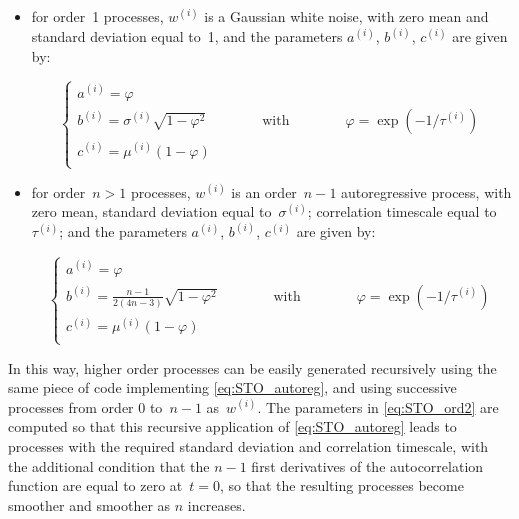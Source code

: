 \documentclass[../main/NEMO_manual]{subfiles}
\begin{document}
\begin{itemize}
\item for order~1 processes, $w^{(i)}$ is a Gaussian white noise, with zero mean and standard deviation equal to~1,
  and the parameters $a^{(i)}$, $b^{(i)}$, $c^{(i)}$ are given by:

  \[
    \left\{
      \begin{array}{l}
        a^{(i)} = \varphi \\
        b^{(i)} = \sigma^{(i)} \sqrt{ 1 - \varphi^2 }        \qquad\qquad\mbox{with}\qquad\qquad \varphi = \exp \left( - 1 / \tau^{(i)} \right) \\
        c^{(i)} = \mu^{(i)} \left( 1 - \varphi \right) \\
      \end{array}
    \right.
  \]

\item for order~$n>1$ processes, $w^{(i)}$ is an order~$n-1$ autoregressive process, with zero mean,
  standard deviation equal to~$\sigma^{(i)}$;
  correlation timescale equal to~$\tau^{(i)}$;
  and the parameters $a^{(i)}$, $b^{(i)}$, $c^{(i)}$ are given by:

  \begin{equation}
    \label{eq:STO_ord2}
    \left\{
      \begin{array}{l}
        a^{(i)} = \varphi \\
        b^{(i)} = \frac{n-1}{2(4n-3)} \sqrt{ 1 - \varphi^2 }
        \qquad\qquad\mbox{with}\qquad\qquad
        \varphi = \exp \left( - 1 / \tau^{(i)} \right) \\
        c^{(i)} = \mu^{(i)} \left( 1 - \varphi \right) \\
      \end{array}
    \right.
  \end{equation}

\end{itemize}

\noindent
In this way, higher order processes can be easily generated recursively using the same piece of code implementing
\autoref{eq:STO_autoreg}, and using successive processes from order $0$ to~$n-1$ as~$w^{(i)}$.
The parameters in \autoref{eq:STO_ord2} are computed so that this recursive application of
\autoref{eq:STO_autoreg} leads to processes with the required standard deviation and correlation timescale,
with the additional condition that the $n-1$ first derivatives of the autocorrelation function are equal to
zero at~$t=0$, so that the resulting processes become smoother and smoother as $n$ increases.
\end{document}
